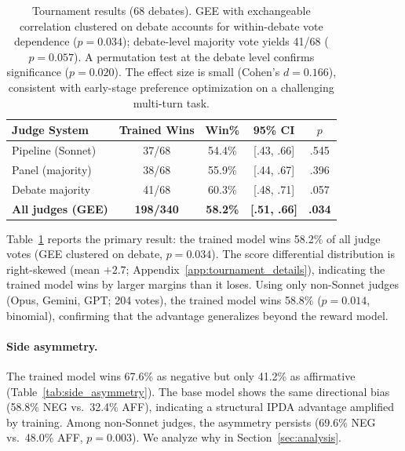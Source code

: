 \begin{table}[t]
\centering
\small
\begin{tabular}{lcccc}
\toprule
\textbf{Judge System} & \textbf{Trained Wins} & \textbf{Win\%} & \textbf{95\% CI} & $p$ \\
\midrule
Pipeline (Sonnet) & 37/68 & 54.4\% & [.43, .66] & .545 \\
Panel (majority) & 38/68 & 55.9\% & [.44, .67] & .396 \\
Debate majority & 41/68 & 60.3\% & [.48, .71] & .057 \\
\midrule
\textbf{All judges (GEE)} & \textbf{198/340} & \textbf{58.2\%} & \textbf{[.51, .66]} & \textbf{.034} \\
\bottomrule
\end{tabular}
\caption{Tournament results (68 debates). GEE with exchangeable correlation
clustered on debate accounts for within-debate vote dependence
($p = 0.034$); debate-level majority vote yields 41/68 ($p = 0.057$).
A permutation test at the debate level confirms significance ($p = 0.020$).
The effect size is small (Cohen's $d = 0.166$), consistent with early-stage
preference optimization on a challenging multi-turn task.}
\label{tab:tournament}
\end{table}

Table~\ref{tab:tournament} reports the primary result: the trained model
wins 58.2\% of all judge votes (GEE clustered on debate, $p = 0.034$).
The score differential distribution is right-skewed (mean $+2.7$;
Appendix~\ref{app:tournament_details}), indicating the trained model wins
by larger margins than it loses. Using only non-Sonnet judges
(Opus, Gemini, GPT; 204 votes), the trained model wins 58.8\% ($p = 0.014$,
binomial), confirming that the advantage generalizes beyond the reward
model.

\paragraph{Side asymmetry.}
\label{sec:side_asymmetry}
The trained model wins 67.6\% as negative but only 41.2\% as affirmative
(Table~\ref{tab:side_asymmetry}). The base model shows the same directional
bias (58.8\% NEG vs.\ 32.4\% AFF), indicating a structural IPDA advantage
amplified by training. Among non-Sonnet judges, the asymmetry persists
(69.6\% NEG vs.\ 48.0\% AFF, $p = 0.003$). We analyze why in
Section~\ref{sec:analysis}.

